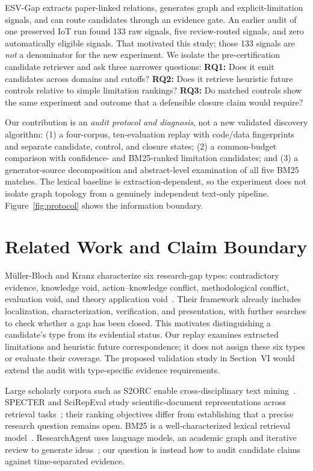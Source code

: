 \documentclass[conference,a4paper]{IEEEtran}
\begin{document}
ESV-Gap extracts paper-linked relations, generates graph and explicit-limitation signals, and can route candidates through an evidence gate. An earlier audit of one preserved IoT run found 133 raw signals, five review-routed signals, and zero automatically eligible signals. That motivated this study; those 133 signals are \emph{not} a denominator for the new experiment. We isolate the pre-certification candidate retriever and ask three narrower questions: \textbf{RQ1:} Does it emit candidates across domains and cutoffs? \textbf{RQ2:} Does it retrieve heuristic future controls relative to simple limitation rankings? \textbf{RQ3:} Do matched controls show the same experiment and outcome that a defensible closure claim would require?

Our contribution is an \emph{audit protocol and diagnosis}, not a new validated discovery algorithm: (1) a four-corpus, ten-evaluation replay with code/data fingerprints and separate candidate, control, and closure states; (2) a common-budget comparison with confidence- and BM25-ranked limitation candidates; and (3) a generator-source decomposition and abstract-level examination of all five BM25 matches. The lexical baseline is extraction-dependent, so the experiment does not isolate graph topology from a genuinely independent text-only pipeline. Figure~\ref{fig:protocol} shows the information boundary.

\section{Related Work and Claim Boundary}
M\"uller-Bloch and Kranz characterize six research-gap types: contradictory evidence, knowledge void, action--knowledge conflict, methodological conflict, evaluation void, and theory application void~\cite{mullerbloch2015}. Their framework already includes localization, characterization, verification, and presentation, with further searches to check whether a gap has been closed. This motivates distinguishing a candidate's type from its evidential status. Our replay examines extracted limitations and heuristic future correspondence; it does not assign these six types or evaluate their coverage. The proposed validation study in Section~VI would extend the audit with type-specific evidence requirements.

Large scholarly corpora such as S2ORC enable cross-disciplinary text mining~\cite{lo2020}. SPECTER and SciRepEval study scientific-document representations across retrieval tasks~\cite{cohan2020,singh2023}; their ranking objectives differ from establishing that a precise research question remains open. BM25 is a well-characterized lexical retrieval model~\cite{robertson2009}. ResearchAgent uses language models, an academic graph and iterative review to generate ideas~\cite{baek2025}; our question is instead how to audit candidate claims against time-separated evidence.
\end{document}
